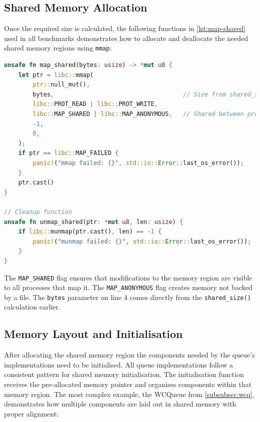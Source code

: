 \subsection{Shared Memory Allocation}

Once the required size is calculated, the following functions in \cref{lst:map-shared} used in all benchmarks demonstrates how to allocate and deallocate the needed shared memory regions using \texttt{mmap}:

\begin{lstlisting}[language=Rust, style=boxed, caption={Shared memory allocation using mmap}, label={lst:map-shared}]
unsafe fn map_shared(bytes: usize) -> *mut u8 {
    let ptr = libc::mmap(
        ptr::null_mut(),
        bytes,                                    // Size from shared_size()
        libc::PROT_READ | libc::PROT_WRITE,
        libc::MAP_SHARED | libc::MAP_ANONYMOUS,   // Shared between processes
        -1,
        0,
    );
    if ptr == libc::MAP_FAILED {
        panic!("mmap failed: {}", std::io::Error::last_os_error());
    }
    ptr.cast()
}

// Cleanup function
unsafe fn unmap_shared(ptr: *mut u8, len: usize) {
    if libc::munmap(ptr.cast(), len) == -1 {
        panic!("munmap failed: {}", std::io::Error::last_os_error());
    }
}
\end{lstlisting}

The \texttt{MAP\_SHARED} flag ensures that modifications to the memory region are visible to all processes that map it. The \texttt{MAP\_ANONYMOUS} flag creates memory not backed by a file. The \texttt{bytes} parameter on line 4 comes directly from the \texttt{shared\_size()} calculation earlier.

\subsection{Memory Layout and Initialisation}

After allocating the shared memory region the components needed by the queue's implementations need to be initialised. All queue implementations follow a consistent pattern for shared memory initialisation. The initialisation function receives the pre-allocated memory pointer and organises components within that memory region. The most complex example, the WCQueue from \cref{subsubsec:wcq}, demonstrates how multiple components are laid out in shared memory with proper alignment:

